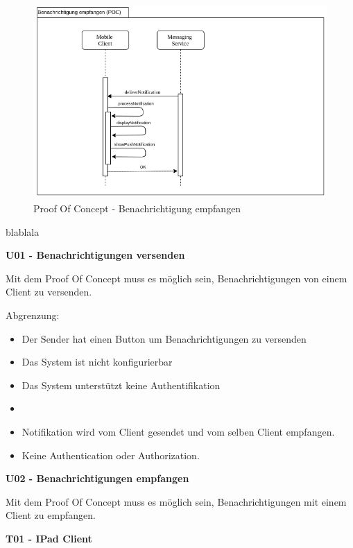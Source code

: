 \begin{figure}[h]
    \centering
    \begin{minipage}[b]{1.0\textwidth}
        \includegraphics[width=\textwidth]{graphics/Sequence_POC_Receive}
        \caption{Proof Of Concept - Benachrichtigung empfangen}
    \end{minipage}
\end{figure}


blablala





\textbf{U01 - Benachrichtigungen versenden}

Mit dem Proof Of Concept muss es möglich sein, Benachrichtigungen von einem Client zu versenden.

Abgrenzung:
\begin{itemize}
    \item Der Sender hat einen Button um Benachrichtigungen zu versenden
    \item Das System ist nicht konfigurierbar
    \item Das System unterstützt keine Authentifikation
    \item
    \item Notifikation wird vom Client gesendet und vom selben Client empfangen.
    \item Keine Authentication oder Authorization.
\end{itemize}


\textbf{U02 - Benachrichtigungen empfangen}

Mit dem Proof Of Concept muss es möglich sein, Benachrichtigungen mit einem Client zu empfangen.


\textbf{T01 - IPad Client}

